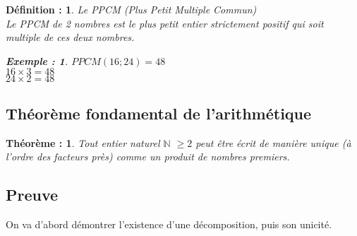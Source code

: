 \documentclass[titlepage]{article}
\newtheorem{theorem}{Théorème :}
\newtheorem{exemple}{Exemple :}
\newtheorem{definiton}{Définition :}
\begin{document}
\begin{definiton}Le PPCM (Plus Petit Multiple Commun)\\
Le PPCM de 2 nombres est le plus petit entier strictement positif qui soit multiple de ces deux nombres.

\begin{exemple}
$PPCM(16 ; 24) = 48$\\
$16 \times 3 = 48$	\\
$24 \times 2 = 48$ 	\\
\end{exemple}

\end{definiton}

\newpage

\subsection{Théorème fondamental de l'arithmétique}

\begin{theorem}
Tout entier naturel $\mathbb{N}$ $\geq 2$ peut être écrit de manière unique (à l'ordre des facteurs près) comme un produit de nombres premiers.
\end{theorem}

\subsection{Preuve}

\hspace{1 cm}On va d'abord démontrer l'existence d'une décomposition, puis son unicité.
\end{document}
